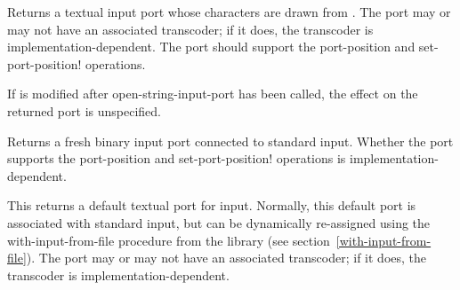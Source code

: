 \begin{entry}{%
}

Returns a textual input port whose characters are drawn from
.  The port may or may not have an associated transcoder;
if it does, the transcoder is implementation-dependent.
The port should support the
{\cf port-position} and {\cf set-port-position!} operations.

If  is modified after {\cf open-string-input-port}
has been called, the effect on the returned port is unspecified.
\end{entry}

\begin{entry}{%
}
   
Returns a fresh binary input port connected to standard input.
Whether the port supports the {\cf port-position} and {\cf
  set-port-position!} operations is implementation-dependent.
\end{entry}

\begin{entry}{%
}
 
This returns a default textual port for input.  Normally, this default port
is associated with standard input, but can be dynamically re-assigned
using the {\cf with-input-from-file} procedure from the
 library (see section~\ref{with-input-from-file}).
The port may or may not have an associated transcoder; if it does, the
transcoder is implementation-dependent.
\end{entry}

